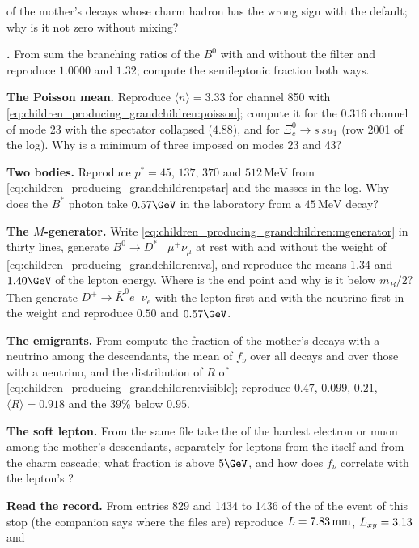\begin{exercises}
  of the mother's decays whose charm hadron has the wrong sign with the
  default; why is it not zero without mixing?
\item \textbf{.} From  sum the
  branching ratios of the $B^0$ with and without the  filter
  and reproduce $1.0000$ and $1.32$; compute the semileptonic fraction
  both ways.
\item \textbf{The Poisson mean.} Reproduce $\langle n\rangle=3.33$ for
  channel 850 with \cref{eq:children_producing_grandchildren:poisson};
  compute it for the $0.316$ channel of mode 23 with the spectator
  collapsed ($4.88$), and for $\Xi_c^0\to s\,su_1$ (row 2001 of the
  log). Why is a
  minimum of three imposed on modes 23 and 43?
\item \textbf{Two bodies.} Reproduce $p^*=45$, $137$, $370$ and $512\,\mathrm{MeV}$
  from \cref{eq:children_producing_grandchildren:pstar} and the masses in
  the log. Why does the $B^*$ photon take $0.57\GeV$ in the laboratory
  from a $45\,\mathrm{MeV}$ decay?
\item \textbf{The $M$-generator.} Write
  \cref{eq:children_producing_grandchildren:mgenerator} in thirty lines,
  generate $B^0\to D^{*-}\mu^+\nu_\mu$ at rest with and without the weight
  of \cref{eq:children_producing_grandchildren:va}, and reproduce the
  means $1.34$ and $1.40\GeV$ of the lepton energy. Where is the end point
  and why is it below $m_B/2$? Then generate $D^+\to\bar K^0e^+\nu_e$
  with the lepton first and with the neutrino first in the weight and
  reproduce $0.50$ and $0.57\GeV$.
\item \textbf{The emigrants.} From 
  compute the fraction of the mother's decays with a neutrino among the
  descendants, the mean of $f_\nu$ over all decays and over those with a
  neutrino, and the distribution of $R$ of
  \cref{eq:children_producing_grandchildren:visible}; reproduce $0.47$,
  $0.099$, $0.21$, $\langle R\rangle=0.918$ and the $39\%$ below $0.95$.
\item \textbf{The soft lepton.} From the same file take the \pt of the
  hardest electron or muon among the mother's descendants, separately for
  leptons from the \Bbar itself and from the charm cascade; what fraction
  is above $5\GeV$, and how does $f_\nu$ correlate with the lepton's \pt?
\item \textbf{Read the \CMSSW record.} From entries 829 and 1434 to 1436 of
  the  of the \CMSSW event of this stop (the companion
  says where the files are) reproduce $L=7.83\,\mathrm{mm}$, $L_{xy}=3.13$ and

\end{exercises}
